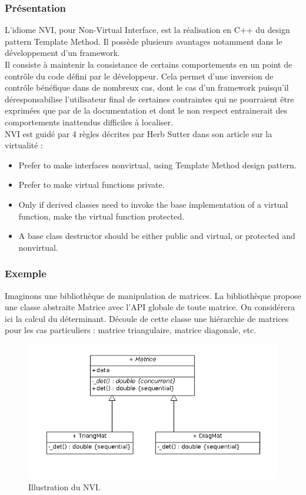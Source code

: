 \subsubsection{Présentation}
L'idiome NVI, pour Non-Virtual Interface, est la réalisation en C++ du design pattern Template Method. Il possède plusieurs avantages notamment dans le développement d'un framework.\\
Il consiste à maintenir la consistance de certains comportements en un point de contrôle du code défini par le développeur. Cela permet d'une inversion de contrôle bénéfique dans de nombreux cas, dont le cas d'un framework puisqu'il déresponsabilise l'utilisateur final de certaines contraintes qui ne pourraient être exprimées que par de la documentation et dont le non respect entrainerait des comportements inattendus difficiles à localiser.\\
NVI est guidé par 4 règles décrites par Herb Sutter dans son article sur la virtualité :
\begin{itemize}
\item Prefer to make interfaces nonvirtual, using Template Method design pattern.
\item Prefer to make virtual functions private.
\item Only if derived classes need to invoke the base implementation of a virtual function, make the virtual function protected.
\item A base class destructor should be either public and virtual, or protected and nonvirtual.
\end{itemize}

\subsubsection{Exemple}
Imaginons une bibliothèque de manipulation de matrices. La bibliothèque propose une classe abstraite Matrice avec l'API globale de toute matrice. On considérera ici la calcul du déterminant. Découle de cette classe une hiérarchie de matrices pour les cas particuliers : matrice triangulaire, matrice diagonale, etc.\\

\begin{figure}[!h]\centering
    \includegraphics[scale=0.7]{images/nvi_illu.png}
    \caption{\label{nvi_uml} Illustration du NVI.}
\end{figure}

